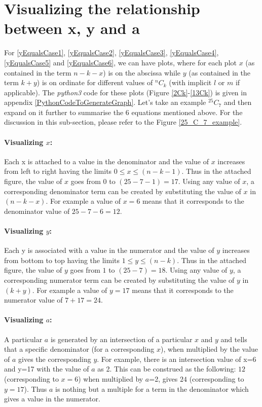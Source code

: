 \documentclass[10pt, twoside]{article}
\newcommand*{\Combination}[2]{{}^{#1}C_{#2}}%
\begin{document}
\section{Visualizing the relationship between x, y and a}\label{Visualization}
For \eqref{yEqualsCase1}, \eqref{yEqualsCase2}, \eqref{yEqualsCase3}, \eqref{yEqualsCase4}, \eqref{yEqualsCase5} and \eqref{yEqualsCase6}, we can have plots, where for each plot $x$ (as contained in the term $n-k-x$) is on the abscissa while $y$ (as contained in the term $k+y$) is on ordinate for different values of $\Combination{n}{k}$ (with implicit $l$ or $m$ if applicable). The \textit{python3} code for these plots (Figure \ref{2Ck}-\ref{13Ck}) is given in appendix \ref{PythonCodeToGenerateGraph}. Let's take an example $\Combination{25}{7}$ and then expand on it further to summarise the 6 equations mentioned above. For the discussion in this sub-section, please refer to the Figure \ref{25_C_7_example}. 
\paragraph{Visualizing $x$:}Each x is attached to a value in the denominator and the value of $x$ increases from left to right having the limits $0 \leq x \leq (n-k-1)$. Thus in the attached figure, the value of $x$ goes from $0$ to $(25-7-1)=17$. Using any value of $x$, a corresponding denominator term can be created by substituting the value of $x$ in $(n-k-x)$. For example a value of $x=6$ means that it corresponds to the denominator value of $25-7-6=12$.
\paragraph{Visualizing $y$:}Each y is associated with a value in the numerator and the value of $y$ increases from bottom to top having the limits $1 \leq y \leq (n-k)$. Thus in the attached figure, the value of $y$ goes from $1$ to $(25-7)=18$. Using any value of $y$, a corresponding numerator term can be created by substituting the value of $y$ in $(k+y)$. For example a value of $y=17$ means that it corresponds to the numerator value of $7+17=24$.
\paragraph{Visualizing $a$:}A particular \textbf{$a$} is generated by an intersection of a particular $x$ and $y$ and tells that a specific denominator (for a corresponding $x$), when multiplied by the value of \textbf{$a$} gives the corresponding $y$. For example, there is an intersection value of x=6 and y=17 with the value of \textbf{$a$} as 2. This can be construed as the following: $12$ (corresponding to $x=6$) when multiplied by \textbf{$a$}=2, gives $24$ (corresponding to $y=17$). Thus \textbf{$a$} is nothing but a multiple for a term in the denominator which gives a value in the numerator.
\end{document}
